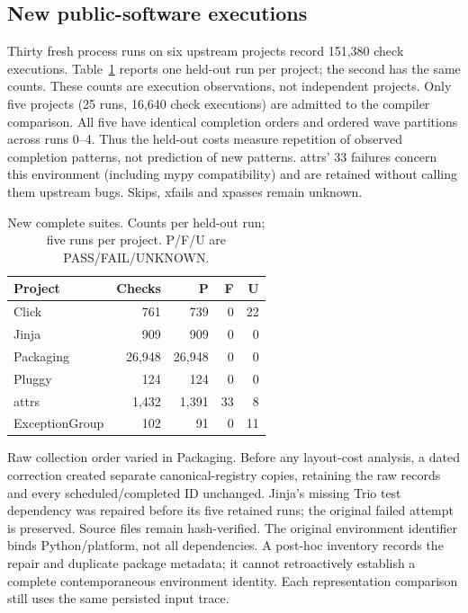 \documentclass[10pt,journal,compsoc]{IEEEtran}
\theoremstyle{definition}\newtheorem{definition}[theorem]{Definition}
\begin{document}
\subsection{New public-software executions}
Thirty fresh process runs on six upstream projects record 151,380 check
executions. Table~\ref{tab:v11-cohort} reports one held-out run per project;
the second has the same counts. These counts are execution observations,
not independent projects. Only five projects (25 runs, 16,640 check
executions) are admitted to the compiler comparison. All five have identical
completion orders and ordered wave partitions across runs 0--4. Thus the
held-out costs measure repetition of observed completion patterns, not
prediction of new patterns. attrs' 33 failures concern this environment
(including mypy compatibility) and are retained without calling them
upstream bugs. Skips, xfails and xpasses remain unknown.

\begin{table}[t]\centering\footnotesize
\caption{New complete suites. Counts per held-out run; five runs per project.
P/F/U are PASS/FAIL/UNKNOWN.}\label{tab:v11-cohort}
\begin{tabular}{@{}lrrrr@{}}\toprule
Project & Checks & P & F & U\\\midrule
Click & 761 & 739 & 0 & 22 \\
Jinja & 909 & 909 & 0 & 0 \\
Packaging & 26,948 & 26,948 & 0 & 0 \\
Pluggy & 124 & 124 & 0 & 0 \\
attrs & 1,432 & 1,391 & 33 & 8 \\
ExceptionGroup & 102 & 91 & 0 & 11 \\
\bottomrule\end{tabular}
\end{table}

Raw collection order varied in Packaging. Before any layout-cost analysis,
a dated correction created separate canonical-registry copies, retaining
the raw records and every scheduled/completed ID unchanged. Jinja's missing
Trio test dependency was repaired before its five retained runs; the original
failed attempt is preserved. Source files remain hash-verified. The original
environment identifier binds Python/platform, not all dependencies.
A post-hoc inventory records the repair and duplicate package metadata;
it cannot retroactively establish a complete contemporaneous environment
identity. Each representation comparison still uses the same persisted
input trace.
\end{document}
